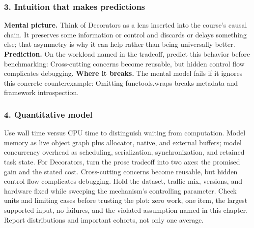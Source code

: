 \subsubsection*{3. Intuition that makes predictions}
\textbf{Mental picture.} Think of Decorators as a lens inserted into the course's causal chain. It preserves some information or control and discards or delays something else; that asymmetry is why it can help rather than being universally better.
\textbf{Prediction.} On the workload named in the tradeoff, predict this behavior before benchmarking: Cross-cutting concerns become reusable, but hidden control flow complicates debugging.
\textbf{Where it breaks.} The mental model fails if it ignores this concrete counterexample: Omitting functools.wraps breaks metadata and framework introspection.
\subsubsection*{4. Quantitative model}
Use wall time versus CPU time to distinguish waiting from computation. Model memory as live object graph plus allocator, native, and external buffers; model concurrency overhead as scheduling, serialization, synchronization, and retained task state.
For Decorators, turn the prose tradeoff into two axes: the promised gain and the stated cost. Cross-cutting concerns become reusable, but hidden control flow complicates debugging. Hold the dataset, traffic mix, versions, and hardware fixed while sweeping the mechanism's controlling parameter.
Check units and limiting cases before trusting the plot: zero work, one item, the largest supported input, no failures, and the violated assumption named in this chapter. Report distributions and important cohorts, not only one average.
